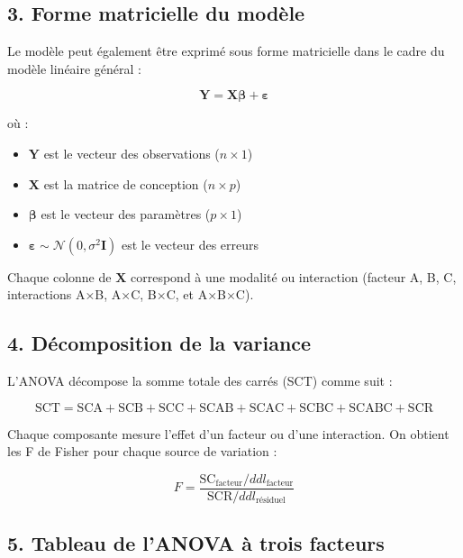 \documentclass[
]{article}
\providecommand{\tightlist}{%
  \setlength{\itemsep}{0pt}\setlength{\parskip}{0pt}}
\begin{document}
\subsection{3. Forme matricielle du
modèle}\label{forme-matricielle-du-moduxe8le}

Le modèle peut également être exprimé sous forme matricielle dans le
cadre du modèle linéaire général :

\[
\mathbf{Y} = \mathbf{X} \boldsymbol{\beta} + \boldsymbol{\varepsilon}
\]

où :

\begin{itemize}
\tightlist
\item
  \(\mathbf{Y}\) est le vecteur des observations (\(n \times 1\))
\item
  \(\mathbf{X}\) est la matrice de conception (\(n \times p\))
\item
  \(\boldsymbol{\beta}\) est le vecteur des paramètres (\(p \times 1\))
\item
  \(\boldsymbol{\varepsilon} \sim \mathcal{N}(0, \sigma^2 \mathbf{I})\)
  est le vecteur des erreurs
\end{itemize}

Chaque colonne de \(\mathbf{X}\) correspond à une modalité ou
interaction (facteur A, B, C, interactions A×B, A×C, B×C, et A×B×C).

\subsection{4. Décomposition de la
variance}\label{duxe9composition-de-la-variance}

L'ANOVA décompose la somme totale des carrés (SCT) comme suit :

\[
\text{SCT} = \text{SCA} + \text{SCB} + \text{SCC} + \text{SCAB} + \text{SCAC} + \text{SCBC} + \text{SCABC} + \text{SCR}
\]

Chaque composante mesure l'effet d'un facteur ou d'une interaction. On
obtient les F de Fisher pour chaque source de variation :

\[
F = \frac{\text{SC}_{\text{facteur}} / ddl_{\text{facteur}}}{\text{SCR} / ddl_{\text{résiduel}}}
\]

\subsection{5. Tableau de l'ANOVA à trois
facteurs}\label{tableau-de-lanova-uxe0-trois-facteurs}
\end{document}
